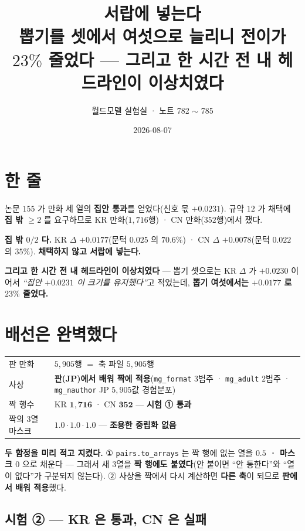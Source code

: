 \documentclass[10pt,a4paper]{article}
\title{\bfseries 서랍에 넣는다\\[2pt]
\large 뽑기를 셋에서 여섯으로 늘리니 전이가 $23\%$ 줄었다 --- 그리고 한 시간 전 내
헤드라인이 이상치였다}
\author{월드모델 실험실 · 노트 782 $\sim$ 785}
\date{2026-08-07}
\begin{document}
\maketitle

\section{한 줄}

논문 $155$ 가 만화 세 열의 \textbf{집안 통과}를 얻었다(신호 몫 $+0.0231$). 규약 $12$ 가
채택에 \textbf{집 밖 $\geq 2$} 를 요구하므로 KR 만화($1{,}716$행) · CN 만화($352$행)에서
쟀다.

\textbf{집 밖 $0/2$ 다.} KR $\Delta$ $\mathbf{+0.0177}$(문턱 $0.025$ 의 $70.6\%$) ·
CN $\Delta$ $+0.0078$(문턱 $0.022$ 의 $35\%$). \textbf{채택하지 않고 서랍에 넣는다.}

\textbf{그리고 한 시간 전 내 헤드라인이 이상치였다} --- 뽑기 셋으로는 KR $\Delta$ 가
$+0.0230$ 이어서 \emph{``집안 $+0.0231$ 이 크기를 유지했다''}고 적었는데, \textbf{뽑기
여섯에서는 $+0.0177$ 로 $23\%$ 줄었다.}

\section{배선은 완벽했다}

\begin{center}
\begin{tabular}{ll}
\toprule
판 만화 & $5{,}905$행 $=$ 축 파일 $5{,}905$행 \\
사상 & \textbf{판(JP)에서 배워 짝에 적용}(\texttt{mg\_format} $3$범주 · \texttt{mg\_adult}
$2$범주 · \texttt{mg\_nauthor} JP $5{,}905$값 경험분포) \\
짝 행수 & KR $\mathbf{1{,}716}$ · CN $\mathbf{352}$ --- \textbf{시험 ① 통과} \\
짝의 $3$열 마스크 & $1.0 \cdot 1.0 \cdot 1.0$ --- \textbf{조용한 중립화 없음} \\
\bottomrule
\end{tabular}
\end{center}

\textbf{두 함정을 미리 적고 지켰다.} ① \texttt{pairs.to\_arrays} 는 짝 행에 없는 열을
\textbf{$0.5$ · 마스크 $0$} 으로 채운다 --- 그래서 새 $3$열을 \textbf{짝 행에도
붙였다}(안 붙이면 ``안 통한다''와 ``열이 없다''가 구분되지 않는다). ② 사상을 짝에서
다시 계산하면 \textbf{다른 축}이 되므로 \textbf{판에서 배워 적용}했다.

\subsection*{시험 ② --- KR 은 통과, CN 은 실패}
\end{document}
